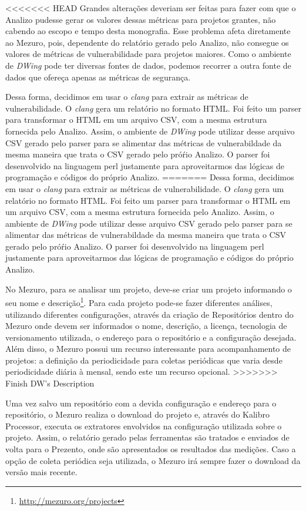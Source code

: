 <<<<<<< HEAD
Grandes alterações deveriam ser feitas para fazer com que o Analizo pudesse gerar os valores dessas métricas para projetos grantes, não cabendo ao escopo e tempo desta monografia. Esse problema afeta diretamente ao Mezuro, pois, dependente do relatório gerado pelo Analizo, não consegue os valores de métricas de vulnerabilidade para projetos maiores. Como o ambiente de \emph{DWing} pode ter diversas fontes de dados, podemos recorrer a outra fonte de dados que ofereça apenas as métricas de segurança.

Dessa forma, decidimos em usar o \emph{clang} para extrair as métricas de vulnerabilidade. O \emph{clang} gera um relatório no formato HTML. Foi feito um parser para transformar o HTML em um arquivo CSV, com a mesma estrutura fornecida pelo Analizo. Assim, o ambiente de \emph{DWing} pode utilizar desse arquivo CSV gerado pelo parser para se alimentar das métricas de vulnerabildade da mesma maneira que trata o CSV gerado pelo próŕio Analizo. O parser foi desenvolvido na linguagem perl justamente para aproveitarmos das lógicas de programação e códigos do próprio Analizo.
=======
Dessa forma, decidimos em usar o \emph{clang} para extrair as métricas de vulnerabilidade. O \emph{clang} gera um relatório no formato HTML. Foi feito um parser para transformar o HTML em um arquivo CSV, com a mesma estrutura fornecida pelo Analizo. Assim, o ambiente de \emph{DWing} pode utilizar desse arquivo CSV gerado pelo parser para se alimentar das métricas de vulnerabildade da mesma maneira que trata o CSV gerado pelo próŕio Analizo. O parser foi desenvolvido na linguagem perl justamente para aproveitarmos das lógicas de programação e códigos do próprio Analizo.

No Mezuro, para se analisar um projeto, deve-se criar um projeto informando o seu nome e descrição\footnote{\url{http://mezuro.org/projects}}. Para cada projeto pode-se fazer diferentes análises, utilizando diferentes configurações, através da criação de Repositórios dentro do Mezuro onde devem ser informados o nome, descrição, a licença, tecnologia de versionamento utilizada, o endereço para o repositório e a configuração desejada. Além disso, o Mezuro possui um recurso interessante para acompanhamento de projetos: a definição da periodicidade para coletas periódicas que varia desde periodicidade diária à mensal, sendo este um recurso opcional.
>>>>>>> Finish DW's Description

Uma vez salvo um repositório com a devida configuração e endereço para o repositório, o Mezuro realiza o download do projeto e, através do Kalibro Processor, executa os extratores envolvidos na configuração utilizada sobre o projeto. Assim, o relatório gerado pelas ferramentas são tratados e enviados de volta para o Prezento, onde são apresentados os resultados das medições. Caso a opção de coleta periódica seja utilizada, o Mezuro irá sempre fazer o download da versão mais recente.


